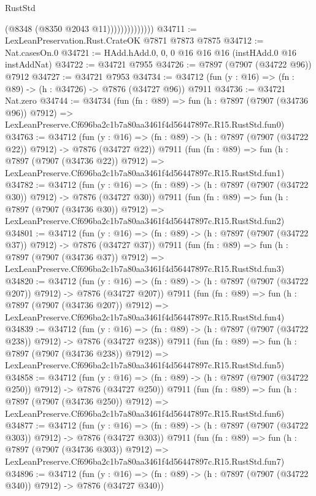 \begin{lexlean}{RustStd}
\begin{coremodule}
                            (@8348 (@8350 @2043 @11))))))))))))))
@34711 := LexLeanPreservation.Rust.CrateOK @7871 @7873 @7875
@34712 := Nat.casesOn.{0}
@34721 := HAdd.hAdd.{0, 0, 0} @16 @16 @16 (instHAdd.{0} @16 instAddNat)
@34722 := @34721 @7955
@34726 := @7897 (@7907 (@34722 @96)) @7912
@34727 := @34721 @7953
@34734 := @34712 (fun (y : @16) => (fn : @89) -> (h : @34726) -> @7876 (@34727 @96)) @7911
@34736 := @34721 Nat.zero
@34744 := @34734
    (fun (fn : @89) =>
    fun (h : @7897 (@7907 (@34736 @96)) @7912) =>
    LexLeanPreserve.Cf696ba2c1b7a80aa3461f4d56447897c.R15.RustStd.fun0)
@34763 := @34712
    (fun (y : @16) => (fn : @89) -> (h : @7897 (@7907 (@34722 @22)) @7912) -> @7876 (@34727 @22))
    @7911
    (fun (fn : @89) =>
    fun (h : @7897 (@7907 (@34736 @22)) @7912) =>
    LexLeanPreserve.Cf696ba2c1b7a80aa3461f4d56447897c.R15.RustStd.fun1)
@34782 := @34712
    (fun (y : @16) => (fn : @89) -> (h : @7897 (@7907 (@34722 @30)) @7912) -> @7876 (@34727 @30))
    @7911
    (fun (fn : @89) =>
    fun (h : @7897 (@7907 (@34736 @30)) @7912) =>
    LexLeanPreserve.Cf696ba2c1b7a80aa3461f4d56447897c.R15.RustStd.fun2)
@34801 := @34712
    (fun (y : @16) => (fn : @89) -> (h : @7897 (@7907 (@34722 @37)) @7912) -> @7876 (@34727 @37))
    @7911
    (fun (fn : @89) =>
    fun (h : @7897 (@7907 (@34736 @37)) @7912) =>
    LexLeanPreserve.Cf696ba2c1b7a80aa3461f4d56447897c.R15.RustStd.fun3)
@34820 := @34712
    (fun (y : @16) => (fn : @89) -> (h : @7897 (@7907 (@34722 @207)) @7912) -> @7876 (@34727 @207))
    @7911
    (fun (fn : @89) =>
    fun (h : @7897 (@7907 (@34736 @207)) @7912) =>
    LexLeanPreserve.Cf696ba2c1b7a80aa3461f4d56447897c.R15.RustStd.fun4)
@34839 := @34712
    (fun (y : @16) => (fn : @89) -> (h : @7897 (@7907 (@34722 @238)) @7912) -> @7876 (@34727 @238))
    @7911
    (fun (fn : @89) =>
    fun (h : @7897 (@7907 (@34736 @238)) @7912) =>
    LexLeanPreserve.Cf696ba2c1b7a80aa3461f4d56447897c.R15.RustStd.fun5)
@34858 := @34712
    (fun (y : @16) => (fn : @89) -> (h : @7897 (@7907 (@34722 @250)) @7912) -> @7876 (@34727 @250))
    @7911
    (fun (fn : @89) =>
    fun (h : @7897 (@7907 (@34736 @250)) @7912) =>
    LexLeanPreserve.Cf696ba2c1b7a80aa3461f4d56447897c.R15.RustStd.fun6)
@34877 := @34712
    (fun (y : @16) => (fn : @89) -> (h : @7897 (@7907 (@34722 @303)) @7912) -> @7876 (@34727 @303))
    @7911
    (fun (fn : @89) =>
    fun (h : @7897 (@7907 (@34736 @303)) @7912) =>
    LexLeanPreserve.Cf696ba2c1b7a80aa3461f4d56447897c.R15.RustStd.fun7)
@34896 := @34712
    (fun (y : @16) => (fn : @89) -> (h : @7897 (@7907 (@34722 @340)) @7912) -> @7876 (@34727 @340))

\end{coremodule}
\end{lexlean}
